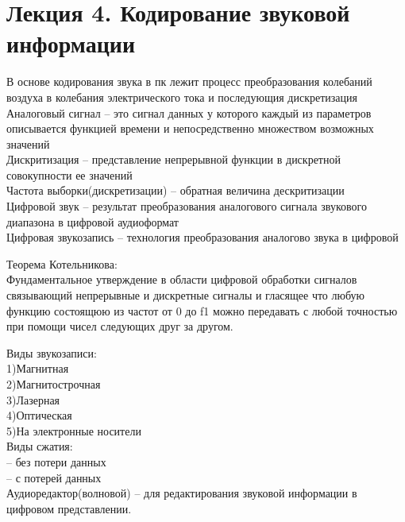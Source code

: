 \documentclass[a4paper, 12pt]{article}
\begin{document}
\section*{Лекция 4. Кодирование звуковой информации}

В основе кодирования звука в пк лежит процесс преобразования колебаний воздуха в колебания электрического тока и последующия дискретизация\\

Аналоговый сигнал -- это сигнал данных у которого каждый из параметров описывается функцией времени и непосредственно множеством возможных значений\\

Дискритизация -- представление непрерывной функции в дискретной совокупности ее значений\\

Частота выборки(дискретизации) -- обратная величина дескритизации\\

Цифровой звук -- результат преобразования аналогового сигнала звукового диапазона в цифровой аудиоформат\\

Цифровая звукозапись -- технология преобразования аналогово звука в цифровой\\

\begin{mdframed}[backgroundcolor=blue!20] 
       Теорема Котельникова:\\
       Фундаментальное утверждение в области цифровой обработки сигналов связывающий непрерывные и дискретные сигналы и гласящее что любую функцию состоящюю из частот от 0 до f1 можно передавать с любой точностью при помощи чисел следующих друг за другом.
    \end{mdframed}
Виды звукозаписи:\\
1)Магнитная \\
2)Магнитострочная\\
3)Лазерная\\
4)Оптическая\\
5)На электронные носители\\

Виды сжатия:\\
-- без потери данных\\
-- с потерей данных\\

Аудиоредактор(волновой) -- для редактирования звуковой информации в цифровом представлении.\\
\end{document}
